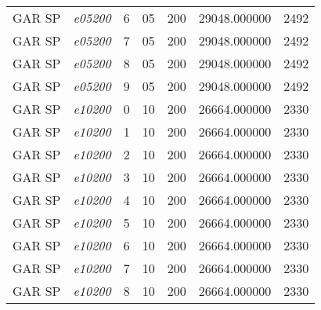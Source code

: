 {\begin{longtable}{cc|c|cc|cc}
			GAR SP             & \textit{e05200}    & 6                               & 05               & 200              & 29048.000000                          & 2492 \\ 
			GAR SP             & \textit{e05200}    & 7                               & 05               & 200              & 29048.000000                          & 2492 \\ 
			GAR SP             & \textit{e05200}    & 8                               & 05               & 200              & 29048.000000                          & 2492 \\ 
			GAR SP             & \textit{e05200}    & 9                               & 05               & 200              & 29048.000000                          & 2492 \\ \hline
			GAR SP             & \textit{e10200}    & 0                               & 10               & 200              & 26664.000000                          & 2330 \\ 
			GAR SP             & \textit{e10200}    & 1                               & 10               & 200              & 26664.000000                          & 2330 \\ 
			GAR SP             & \textit{e10200}    & 2                               & 10               & 200              & 26664.000000                          & 2330 \\ 
			GAR SP             & \textit{e10200}    & 3                               & 10               & 200              & 26664.000000                          & 2330 \\ 
			GAR SP             & \textit{e10200}    & 4                               & 10               & 200              & 26664.000000                          & 2330 \\ 
			GAR SP             & \textit{e10200}    & 5                               & 10               & 200              & 26664.000000                          & 2330 \\ 
			GAR SP             & \textit{e10200}    & 6                               & 10               & 200              & 26664.000000                          & 2330 \\ 
			GAR SP             & \textit{e10200}    & 7                               & 10               & 200              & 26664.000000                          & 2330 \\ 
			GAR SP             & \textit{e10200}    & 8                               & 10               & 200              & 26664.000000                          & 2330 \\ 

\end{longtable}}
